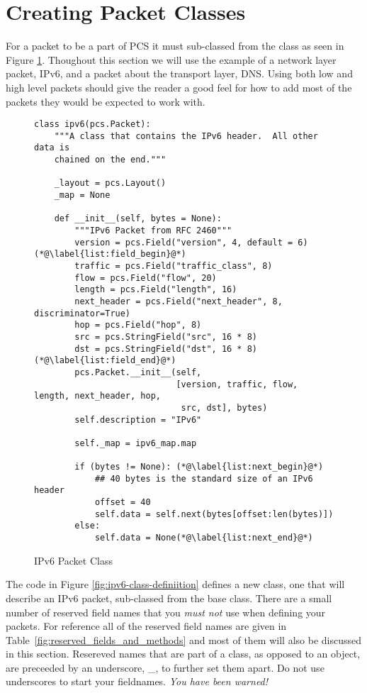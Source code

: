 \documentclass[11pt]{article}
\begin{document}
\section{Creating Packet Classes}

For a packet to be a part of PCS it must sub-classed from the 
class as seen in Figure \ref{fig:ipv6-class-definition}.  Thoughout
this section we will use the example of a network layer packet, IPv6,
and a packet about the transport layer, DNS.  Using both low and high
level packets should give the reader a good feel for how to add most
of the packets they would be expected to work with.

\begin{figure}
  \centering
\begin{lstlisting}
class ipv6(pcs.Packet):
    """A class that contains the IPv6 header.  All other data is
    chained on the end."""

    _layout = pcs.Layout()
    _map = None
    
    def __init__(self, bytes = None):
        """IPv6 Packet from RFC 2460"""
        version = pcs.Field("version", 4, default = 6) (*@\label{list:field_begin}@*)
        traffic = pcs.Field("traffic_class", 8)
        flow = pcs.Field("flow", 20)
        length = pcs.Field("length", 16)
        next_header = pcs.Field("next_header", 8, discriminator=True)
        hop = pcs.Field("hop", 8)
        src = pcs.StringField("src", 16 * 8)
        dst = pcs.StringField("dst", 16 * 8)(*@\label{list:field_end}@*)
        pcs.Packet.__init__(self,
                            [version, traffic, flow, length, next_header, hop,
                             src, dst], bytes)
        self.description = "IPv6"

        self._map = ipv6_map.map

        if (bytes != None): (*@\label{list:next_begin}@*)
            ## 40 bytes is the standard size of an IPv6 header
            offset = 40
            self.data = self.next(bytes[offset:len(bytes)])
        else:
            self.data = None(*@\label{list:next_end}@*)
\end{lstlisting}
  \caption{IPv6 Packet Class}
  \label{fig:ipv6-class-definition}
\end{figure}

The code in Figure \ref{fig:ipv6-class-definiition} defines a new
class, one that will describe an IPv6 packet, sub-classed from the
 base class.  There are a small number of reserved field
names that you \emph{must not} use when defining your packets.  For
reference all of the reserved field names are given in
Table~\ref{fig:reserved_fields_and_methods} and most of them will also
be discussed in this section.  Resereved names that are part of a
class, as opposed to an object, are preceeded by an underscore, \_, to
further set them apart.  Do not use underscores to start your
fieldnames. \emph{You have been warned!}
\end{document}
